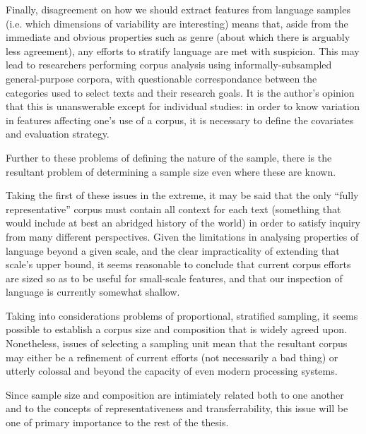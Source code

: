 
Finally, disagreement on how we should extract features from language samples (i.e. which dimensions of variability are interesting) means that, aside from the immediate and obvious properties such as genre (about which there is arguably less agreement), any efforts to stratify language are met with suspicion.  This may lead to researchers performing corpus analysis using informally-subsampled general-purpose corpora, with questionable correspondance between the categories used to select texts and their research goals.
It is the author's opinion that this is unanswerable except for individual studies: in order to know variation in features affecting one's use of a corpus, it is necessary to define the covariates and evaluation strategy.



Further to these problems of defining the nature of the sample, there is the resultant problem of determining a sample size even where these are known.  

Taking the first of these issues in the extreme, it may be said that the only ``fully representative'' corpus must contain all context for each text (something that would include at best an abridged history of the world) in order to satisfy inquiry from many different perspectives.  Given the limitations in analysing properties of language beyond a given scale, and the clear impracticality of extending that scale's upper bound, it seems reasonable to conclude that current corpus efforts are sized so as to be useful for small-scale features, and that our inspection of language is currently somewhat shallow.

Taking into considerations problems of proportional, stratified sampling, it seems possible to establish a corpus size and composition that is widely agreed upon.  Nonetheless, issues of selecting a sampling unit mean that the resultant corpus may either be a refinement of current efforts (not necessarily a bad thing) or utterly colossal and beyond the capacity of even modern processing systems.


Since sample size and composition are intimiately related both to one another and to the concepts of representativeness and transferrability, this issue will be one of primary importance to the rest of the thesis.





